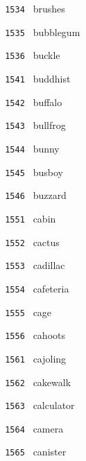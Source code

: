 \documentclass[11pt]{article}
\begin{document}
\begin{multicols}{6}
\noindent \texttt{ 1534 } \hspace{1mm} brushes  \par
\noindent \texttt{ 1535 } \hspace{1mm} bubblegum  \par
\noindent \texttt{ 1536 } \hspace{1mm} buckle  \par
\noindent \texttt{ 1541 } \hspace{1mm} buddhist  \par
\noindent \texttt{ 1542 } \hspace{1mm} buffalo  \par
\noindent \texttt{ 1543 } \hspace{1mm} bullfrog  \par
\noindent \texttt{ 1544 } \hspace{1mm} bunny  \par
\noindent \texttt{ 1545 } \hspace{1mm} busboy  \par
\noindent \texttt{ 1546 } \hspace{1mm} buzzard  \par
\noindent \texttt{ 1551 } \hspace{1mm} cabin  \par
\noindent \texttt{ 1552 } \hspace{1mm} cactus  \par
\noindent \texttt{ 1553 } \hspace{1mm} cadillac  \par
\noindent \texttt{ 1554 } \hspace{1mm} cafeteria  \par
\noindent \texttt{ 1555 } \hspace{1mm} cage  \par
\noindent \texttt{ 1556 } \hspace{1mm} cahoots  \par
\noindent \texttt{ 1561 } \hspace{1mm} cajoling  \par
\noindent \texttt{ 1562 } \hspace{1mm} cakewalk  \par
\noindent \texttt{ 1563 } \hspace{1mm} calculator  \par
\noindent \texttt{ 1564 } \hspace{1mm} camera  \par
\noindent \texttt{ 1565 } \hspace{1mm} canister  \par

\end{multicols}
\end{document}
